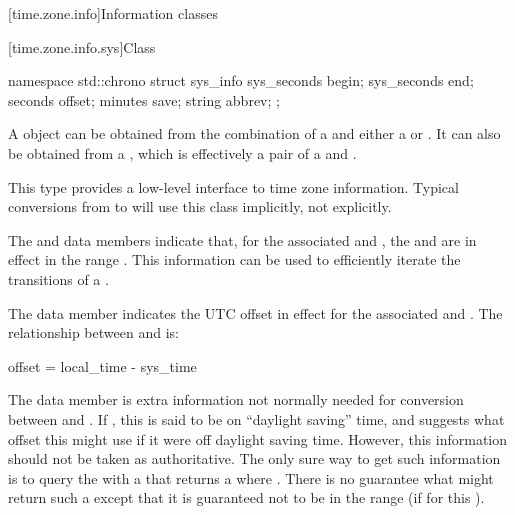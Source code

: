 [time.zone.info]{Information classes}

[time.zone.info.sys]{Class }

\begin{codeblock}
namespace std::chrono {
  struct sys_info {
    sys_seconds   begin;
    sys_seconds   end;
    seconds       offset;
    minutes       save;
    string        abbrev;
  };
}
\end{codeblock}

\pnum
A  object can be obtained
from the combination of a  and
either a  or .
It can also be obtained from a ,
which is effectively a pair of a  and .

\pnum
\begin{note}
This type provides a low-level interface to time zone information.
Typical conversions from  to 
will use this class implicitly, not explicitly.
\end{note}

\pnum
{}%
%
The  and  data members indicate that,
for the associated  and ,
the  and  are in effect in the range .
This information can be used to efficiently iterate the transitions of a .

\pnum
{}%
The  data member indicates
the UTC offset in effect
for the associated  and .
The relationship between  and  is:
\begin{codeblock}
offset = local_time - sys_time
\end{codeblock}

\pnum
{}%
The  data member is extra information not normally needed
for conversion between  and .
If , this  is said to be on ``daylight saving'' time,
and  suggests what offset this  might use
if it were off daylight saving time.
However, this information should not be taken as authoritative.
The only sure way to get such information
is to query the  with a 
that returns a  where .
There is no guarantee what  might return such a 
except that it is guaranteed not to be in the range 
(if  for this ).

